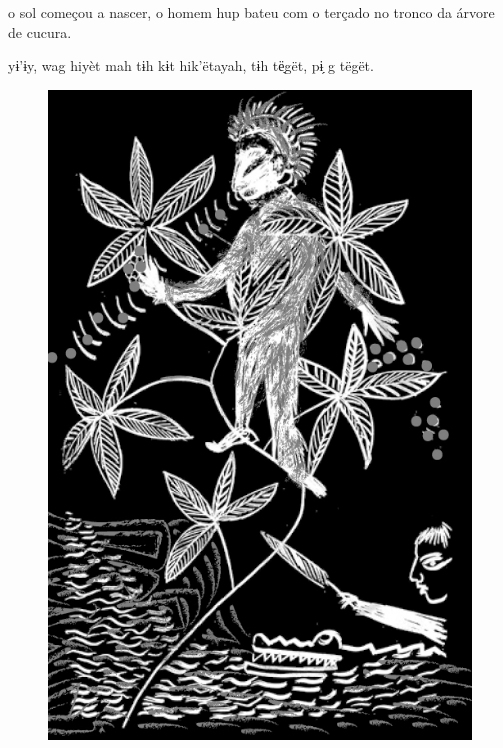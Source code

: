 \chapter*{}

\mbox{}\vspace*{\fill}


 o sol
começou a nascer,
o homem hup bateu
com o terçado no
tronco da árvore
de cucura.

\vspace{2em}

 yɨ’ɨy, wag
hiyèt mah tɨh kɨt
hik’ëtayah, tɨh
të̖gët, pɨ̗ g tëgët.

\vspace*{\fill}

\begin{figure}
\vspace*{-2cm}
\hspace*{-2.4cm}\includegraphics[width=142mm]{./imgs/img5.jpg}
\end{figure}


